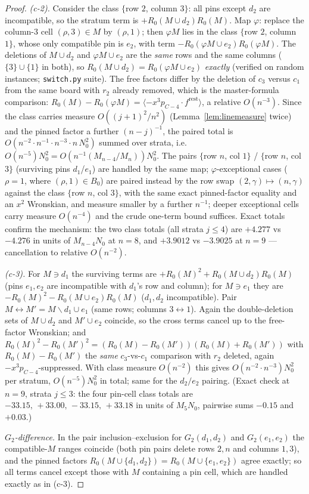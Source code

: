 \documentclass[11pt]{article}
\theoremstyle{definition}
\begin{document}
\begin{proof}
\emph{(c-2).}  Consider the class $\{$row $2$, column $3\}$: all pins
except $d_2$ are incompatible, so the stratum term is
$+R_0(M\cup d_2)R_0(M)$.  Map $\varphi$: replace the column-$3$ cell
$(\rho,3)\in M$ by $(\rho,1)$; then $\varphi M$ lies in the class
$\{$row $2$, column $1\}$, whose only compatible pin is $e_2$, with
term $-R_0(\varphi M\cup e_2)R_0(\varphi M)$.  The deletions of
$M\cup d_2$ and $\varphi M\cup e_2$ are the \emph{same} rows and the
same columns ($\{3\}\cup\{1\}$ in both), so
$R_0(M\cup d_2)=R_0(\varphi M\cup e_2)$ \emph{exactly} (verified on
random instances; \texttt{switch.py} suite).  The free factors differ by
the deletion of $c_3$ versus $c_1$ from the same board with $r_2$
already removed, which is the master-formula comparison:
$R_0(M)-R_0(\varphi M)=\langle-x^3p_{C-4}\cdot
f^{\mathrm{rest}}\rangle$, a relative $O(n^{-3})$.  Since the class
carries measure $O((j{+}1)^2/n^2)$ (Lemma~\ref{lem:linemeasure} twice)
and the pinned factor a further $(n-j)^{-1}$, the paired total is
$O(n^{-2}\cdot n^{-1}\cdot n^{-3}\cdot n\,N_0^2)$ summed over strata,
i.e.\ $O(n^{-5})N_0^2=O(n^{-1}(M_{n-4}/M_n))N_0^2$.  The pairs
$\{$row $n$, col $1\}$ / $\{$row $n$, col $3\}$ (surviving pins
$d_1$/$e_1$) are handled by the same map; $\varphi$-exceptional cases
($\rho=1$, where $(\rho,1)\in B_0$) are paired instead by the row swap
$(2,\gamma)\mapsto(n,\gamma)$ against the class $\{$row $n$, col $3\}$,
with the same exact pinned-factor equality and an $x^2$ Wronskian, and
measure smaller by a further $n^{-1}$; deeper exceptional cells carry
measure $O(n^{-4})$ and the crude one-term bound suffices.
Exact totals confirm the mechanism: the two class totals (all strata
$j\le4$) are $+4.277$ vs $-4.276$ in units of $M_{n-4}N_0$ at $n=8$, and
$+3.9012$ vs $-3.9025$ at $n=9$ --- cancellation to relative
$O(n^{-2})$.

\emph{(c-3).}  For $M\ni d_1$ the surviving terms are
$+R_0(M)^2+R_0(M\cup d_2)R_0(M)$ (pins $e_1,e_2$ are incompatible with
$d_1$'s row and column); for $M\ni e_1$ they are
$-R_0(M)^2-R_0(M\cup e_2)R_0(M)$ ($d_1,d_2$ incompatible).  Pair
$M\leftrightarrow M'=M\smallsetminus d_1\cup e_1$ (same rows; columns
$3\leftrightarrow1$).  Again the double-deletion sets of
$M\cup d_2$ and $M'\cup e_2$ coincide, so the cross terms cancel up to
the free-factor Wronskian; and
$R_0(M)^2-R_0(M')^2=(R_0(M)-R_0(M'))(R_0(M)+R_0(M'))$ with
$R_0(M)-R_0(M')$ the \emph{same} $c_3$-vs-$c_1$ comparison with $r_2$
deleted, again $-x^3p_{C-4}$-suppressed.  With class measure
$O(n^{-2})$ this gives $O(n^{-2}\cdot n^{-3})N_0^2$ per stratum,
$O(n^{-5})N_0^2$ in total; same for the $d_2/e_2$ pairing.  (Exact
check at $n=9$, strata $j\le3$: the four pin-cell class totals are
$-33.15,\,+33.00,\,-33.15,\,+33.18$ in units of $M_5N_0$, pairwise sums
$-0.15$ and $+0.03$.)

\emph{$G_2$-difference.}  In the pair inclusion--exclusion for
$G_2(d_1,d_2)$ and $G_2(e_1,e_2)$ the compatible-$M$ ranges coincide
(both pin pairs delete rows $2,n$ and columns $1,3$), and the pinned
factors $R_0(M\cup\{d_1,d_2\})=R_0(M\cup\{e_1,e_2\})$ agree exactly; so
all terms cancel except those with $M$ containing a pin cell, which are
handled exactly as in (c-3).
\end{proof}
\end{document}
